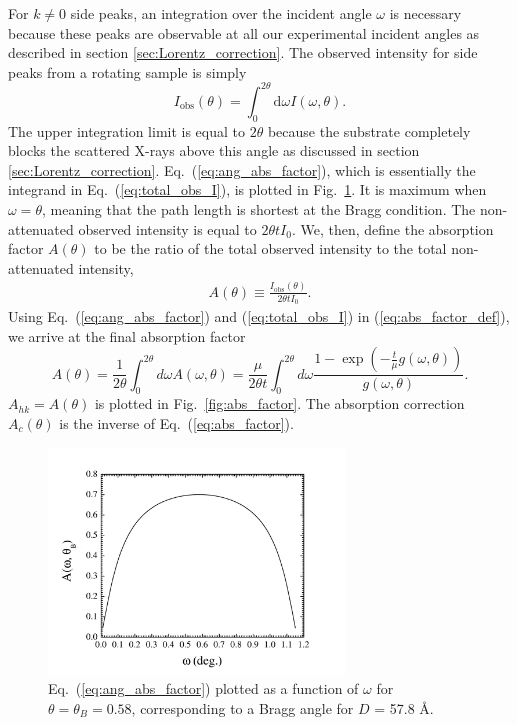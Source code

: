 For $k\neq 0$ side peaks, an integration over the incident angle $\omega$
is necessary because these peaks are observable at all our experimental incident angles as
described in section \ref{sec:Lorentz_correction}.
The observed intensity for side peaks from a rotating sample is simply
\begin{equation}
  I_\textrm{obs}(\theta) 
  = \int_0^{2\theta}\textrm{d}\omega I(\omega,\theta).
  \label{eq:total_obs_I}
\end{equation}
The upper integration limit is equal to $2\theta$ because the substrate
completely blocks the scattered X-rays above this angle as discussed in 
section \ref{sec:Lorentz_correction}. Eq.~(\ref{eq:ang_abs_factor}),
which is essentially the integrand in Eq.~(\ref{eq:total_obs_I}), is 
plotted in Fig.~\ref{fig:abs_integrand}. It is maximum when $\omega=\theta$,
meaning that the path length is shortest at the Bragg condition.
The non-attenuated observed intensity is equal to $2\theta t I_0$. We, then, 
define the absorption factor $A(\theta)$ to be the ratio of the total 
observed intensity to the total non-attenuated intensity,
\begin{align}
  A(\theta) \equiv \frac{I_\textrm{obs}(\theta)}{2\theta tI_0}. 
  \label{eq:abs_factor_def}
\end{align}
Using Eq.~(\ref{eq:ang_abs_factor}) and (\ref{eq:total_obs_I})
in (\ref{eq:abs_factor_def}), we arrive
at the final absorption factor
\begin{equation}
  A(\theta) = \frac{1}{2\theta}\int_0^{2\theta}d\omega A(\omega,\theta)
  = \frac{\mu}{2\theta t} \int_0^{2\theta}d\omega 
  \frac{1-\exp\left(-\frac{t}{\mu}g(\omega,\theta)\right)}{g(\omega,\theta)}.
  \label{eq:abs_factor}
\end{equation}
$A_{hk} = A(\theta)$ is plotted in Fig.~\ref{fig:abs_factor}.
The absorption correction $A_c(\theta)$ is the inverse of Eq.~(\ref{eq:abs_factor}). 

\begin{figure}[htbp]
  \centering
  \includegraphics[width=0.7\textwidth]{figures/ripple/analysis/abs_integrand}
  \caption[Eq.~(\ref{eq:ang_abs_factor}) plotted as a function of $\omega$ for 
  $\theta=\theta_B$]{Eq.~(\ref{eq:ang_abs_factor}) plotted as a function of 
  $\omega$ for $\theta=\theta_B=0.58$\textdegree, corresponding to a Bragg
  angle for $D$ = 57.8 \AA.}
  \label{fig:abs_integrand}
\end{figure}

